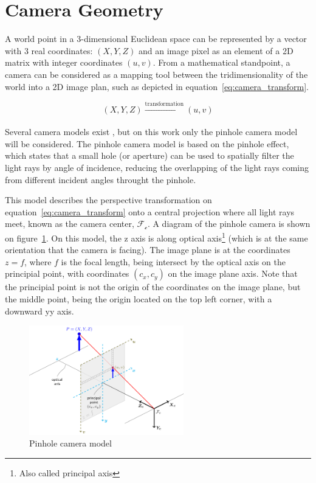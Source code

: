 \section{Camera Geometry}
A world point in a 3-dimensional Euclidean space can be represented by a vector with 3 real coordinates: $(X, Y, Z)$ and an image pixel as an element of a 2D matrix with integer coordinates $(u, v)$. From a mathematical standpoint, a camera can be considered as a mapping tool between the tridimensionality of the world into a 2D image plan, such as depicted in equation~\ref{eq:camera_transform}. 

\begin{equation}
	\label{eq:camera_transform}
	(X, Y, Z) \xrightarrow[]{\text{transformation}} (u, v)
\end{equation}

Several camera models exist \citeneeded, but on this work only the pinhole camera model will be considered. The pinhole camera model is based on the pinhole effect, which states that a small hole (or aperture) can be used to spatially filter the light rays by angle of incidence, reducing the  overlapping of the light rays coming from different incident angles throught the pinhole. 

This model describes the perspective transformation on equation~\ref{eq:camera_transform} onto a central projection where all light rays meet, known as the camera center, $\mathcal{F_c}$. A diagram of the pinhole camera is shown on figure~\ref{fig:pinhole_camera_model}. On this model, the z axis is along optical axis\footnote{Also called principal axis} (which is at the same orientation that the camera is facing). The image plane is at the coordinates $z = f$, where $f$ is the focal length, being intersect by the optical axis on the principial point, with coordinates $(c_x, c_y)$ on the image plane axis. Note that the principial point is not the origin of the coordinates on the image plane, but the middle point, being the origin located on the top left corner, with a downward yy axis.

\begin{figure}
\centering
\includegraphics[width=0.6\textwidth]{img/camera/pinhole_camera_model.png}
\caption{Pinhole camera model}
\label{fig:pinhole_camera_model}
\end{figure}

